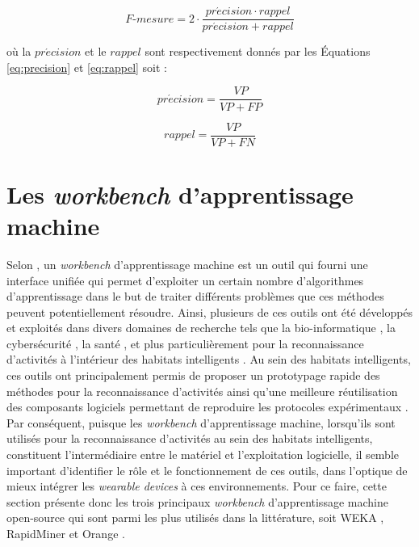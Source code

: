 \begin{equation}
	\label{eq:f-score}
	F\mbox{-} mesure = 2 \cdot \frac{pr\acute{e}cision \cdot rappel}{pr\acute{e}cision + rappel}
\end{equation}

\noindent où la $pr\acute{e}cision$ et le $rappel$ sont respectivement donnés par les Équations \ref{eq:precision} et \ref{eq:rappel} soit :

\begin{equation}
	\label{eq:precision}
	pr\acute{e}cision = \frac{VP}{VP+FP}
\end{equation}

\begin{equation}
	\label{eq:rappel}
	rappel = \frac{VP}{VP+FN}
\end{equation}

\section{Les \textit{workbench} d'apprentissage machine}

Selon \cite{Langlois2008}, un \textit{workbench} d'apprentissage machine est un outil qui fourni une interface unifiée qui permet d'exploiter un certain nombre d'algorithmes d'apprentissage dans le but de traiter différents problèmes que ces méthodes peuvent potentiellement résoudre. Ainsi, plusieurs de ces outils ont été développés et exploités dans divers domaines de recherche tels que la bio-informatique \citep{Larranaga2006}, la cybersécurité \citep{Handa2019}, la santé \citep{Rajkomar2019}, et plus particulièrement pour la reconnaissance d'activités à l'intérieur des habitats intelligents \citep{Chapron2018,Ramirez-Prado2019}. Au sein des habitats intelligents, ces outils ont principalement permis de proposer un prototypage rapide des méthodes pour la reconnaissance d'activités ainsi qu'une meilleure réutilisation des composants logiciels permettant de reproduire les protocoles expérimentaux \citep{Langlois2008}. Par conséquent, puisque les \textit{workbench} d'apprentissage machine, lorsqu'ils sont utilisés pour la reconnaissance d'activités au sein des habitats intelligents, constituent l'intermédiaire entre le matériel et l'exploitation logicielle, il semble important d'identifier le rôle et le fonctionnement de ces outils, dans l'optique de mieux intégrer les \textit{wearable devices} à ces environnements. Pour ce faire, cette section présente donc les trois principaux \textit{workbench} d'apprentissage machine open-source qui sont parmi les plus utilisés dans la littérature, soit WEKA \citep{Holmes1994}, RapidMiner \citep{Ritthoo2003,Hofmann2014} et Orange \citep{Demsar2004,Demsar2013}.

